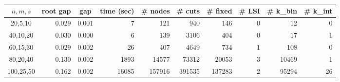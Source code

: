 \documentclass[smallextended]{svjour3hack}       %
\begin{document}
\begin{table}[!ht]
\centering
\begin{tabular}{c|r|r|r|r|r|r|r|rr}
\scriptsize $n,m,s$ & \multicolumn{1}{c|}{\scriptsize root gap} & \multicolumn{1}{c|}{\scriptsize gap} & \multicolumn{1}{c|}{\scriptsize time (sec)} & \multicolumn{1}{c|}{\scriptsize \# nodes} & \multicolumn{1}{c|}{\scriptsize \# cuts} & \multicolumn{1}{c|}{\scriptsize \# fixed} & \multicolumn{1}{c|}{\scriptsize \# LSI} & \multicolumn{1}{c}{\scriptsize \# k\_bin} & \multicolumn{1}{c}{\scriptsize \# k\_int} \\ \hline
20,5,10             & 0.029                                     & 0.001                                & 7                                           & 121                                       & 940                                      & 146                                       & 0                                       & 12                                        & 0                                         \\
40,10,20            & 0.030                                     & 0.000                                & 6                                           & 139                                       & 3106                                     & 404                                       & 0                                       & 17                                        & 1                                         \\
60,15,30            & 0.029                                     & 0.002                                & 26                                          & 407                                       & 4649                                     & 734                                       & 1                                       & 108                                       & 0                                         \\
80,20,40            & 0.130                                     & 0.002                                & 1893                                        & 14577                                     & 73312                                    & 20053                                     & 3                                       & 10469                                     & 1                                         \\
100,25,50           & 0.162                                     & 0.002                                & 16085                                       & 157916                                    & 391535                                   & 137283                                    & 2                                       & 95294                                     & 26                                        \\

\end{tabular}
\end{table}
\end{document}
